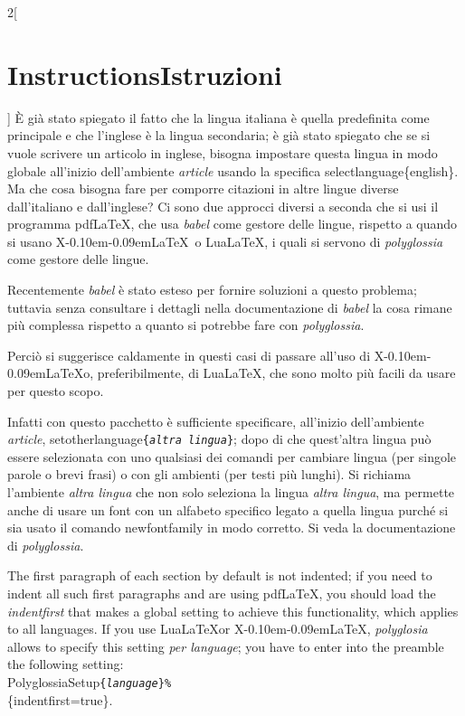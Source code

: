 \documentclass[12pt]{article}
\providecommand\pdfLaTeX{pdf\/\-\LaTeX}
\providecommand\XeLaTeX{X\kern-0.10em\raisebox{1.1ex}{\rotatebox{180}{E}}\kern-0.09em\-\LaTeX}
\providecommand\LuaLaTeX{Lua\-\LaTeX}
\providecommand\meta[1]{\textnormal{\textlangle\textit{#1}\textrangle}}
\providecommand\amb[1]{\textnormal{\slshape#1}}
\providecommand\cs[1]{\textnormal{\ttfamily\char92#1}}
\providecommand\marg[1]{\textnormal{\texttt{\{\meta{#1}\}}}}
\providecommand\Marg[1]{\textnormal{\ttfamily\{#1\}}}
\providecommand\pack[1]{\textnormal{\sffamily\slshape#1}}
\providecommand\italian{\selectlanguage{italian}}
\providecommand\english{\selectlanguage{english}}
\begin{document}
\begin{paracol}{2}[\section{Instructions\hspace{5.6em}Istruzioni}]
\italian
È già stato spiegato il fatto che la lingua italiana è quella predefinita come principale e che l'inglese è la lingua secondaria; è già stato spiegato che se si vuole scrivere un articolo in inglese, bisogna impostare questa lingua in modo globale all'inizio dell'ambiente \amb{article} usando la specifica \cs{selectlanguage}\Marg{english}. Ma che cosa bisogna fare per comporre citazioni in altre lingue diverse dall'italiano e dall'inglese? Ci sono due approcci diversi a seconda che si usi il programma \pdfLaTeX, che usa \pack{babel} come gestore delle lingue, rispetto a quando si usano \XeLaTeX\ o \LuaLaTeX, i quali si servono di \pack{polyglossia} come gestore delle lingue.
\begin{description}[noitemsep]
\item[{\pack{babel}}] Recentemente \pack{babel} è stato esteso per fornire soluzioni a questo problema; tuttavia senza consultare i dettagli nella documentazione di \pack{babel} la cosa rimane più complessa rispetto a quanto si potrebbe fare con \pack{polyglossia}.

Perciò si suggerisce caldamente in questi casi di passare all'uso di \XeLaTeX o, preferibilmente, di \LuaLaTeX, che sono molto più facili da usare per questo scopo. 
%
\item[{\pack{polyglossia}}] Infatti con questo pacchetto è sufficiente specificare, all'inizio dell'ambiente \amb{article}, \cs{setotherlanguage}\marg{altra lingua}; dopo di che quest'altra lingua può essere selezionata con uno qualsiasi dei comandi per cambiare lingua (per singole parole o brevi frasi) o con gli ambienti (per testi più lunghi). Si richiama l'ambiente \amb{altra lingua} che non solo seleziona la lingua \meta{altra lingua}, ma permette anche di usare un font con un alfabeto specifico legato a quella lingua purché si sia usato il comando \cs{newfontfamily} in modo corretto. Si veda la documentazione di \pack{polyglossia}.
%
\end{description}

\english
The first paragraph of each section by default is not indented; if you need to indent all such first paragraphs and are using \pdfLaTeX, you should load the \pack{indentfirst} that makes a global setting to achieve this functionality, which applies to all languages. If you use \LuaLaTeX or \XeLaTeX, \pack{polyglosia} allows to specify this setting \emph{per language}; you have to enter into the preamble the following setting:\\ \cs{PolyglossiaSetup}\marg{language}\texttt{\%}\\{}\null\qquad
\Marg{indentfirst=true}. 


\end{paracol}
\end{document}

